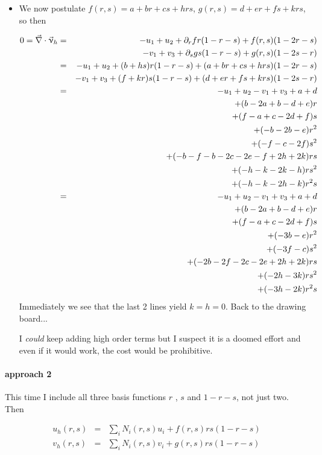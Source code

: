 \begin{itemize}
\item We now postulate $f(r,s)=a+br+cs+hrs$, $g(r,s)=d+er+fs+krs$, so then 


\begin{eqnarray}
0=\vec\nabla\cdot\vec\upnu_h 
&=& -u_1+u_2 + \partial_r f r(1-r-s) + f(r,s)(1-2r-s) \nonumber\\
&&  -v_1+v_3 + \partial_s g s(1-r-s) + g(r,s)(1-2s-r) \nonumber\\
&=& -u_1+u_2 + (b+hs) r(1-r-s) + (a+br+cs+hrs) (1-2r-s) \nonumber\\
&&  -v_1+v_3 + (f+kr) s(1-r-s) + (d+er+fs+krs)(1-2s-r) \nonumber\\
&=& -u_1+u_2  -v_1+v_3 + a + d \nonumber\\
&& +(b-2a+b-d+e)r \nonumber\\
&& +(f-a+c-2d+f)s \nonumber\\
&& +(-b-2b-e)r^2 \nonumber\\
&& +(-f-c-2f)s^2 \nonumber\\
&& +(-b-f-b-2c-2e-f+2h+2k)rs \nonumber\\
&& +(-h-k-2k-h)rs^2 \nonumber\\
&& +(-h-k-2h-k)r^2s \nonumber\\
&=& -u_1+u_2  -v_1+v_3 + a + d \nonumber\\
&& +(b-2a+b-d+e)r \nonumber\\
&& +(f-a+c-2d+f)s \nonumber\\
&& +(-3b-e)r^2 \nonumber\\
&& +(-3f-c)s^2 \nonumber\\
&& +(-2b-2f-2c-2e+2h+2k)rs \nonumber\\
&& +(-2h-3k)rs^2 \nonumber\\
&& +(-3h-2k)r^2s 
\end{eqnarray}
Immediately we see that the last 2 lines yield $k=h=0$. Back to the drawing board...

I {\it could} keep adding high order terms but I suspect it is a doomed effort and even if it would work, the cost would be prohibitive.

\end{itemize}


\paragraph{approach 2} This time I include all three basis functions $r$ , $s$ and $1-r-s$, not just two. Then

\begin{eqnarray}
u_h(r,s)&=&\sum_i N_i(r,s) u_i + f(r,s) rs(1-r-s) \\
v_h(r,s)&=&\sum_i N_i(r,s) v_i + g(r,s) rs(1-r-s) 
\end{eqnarray}

